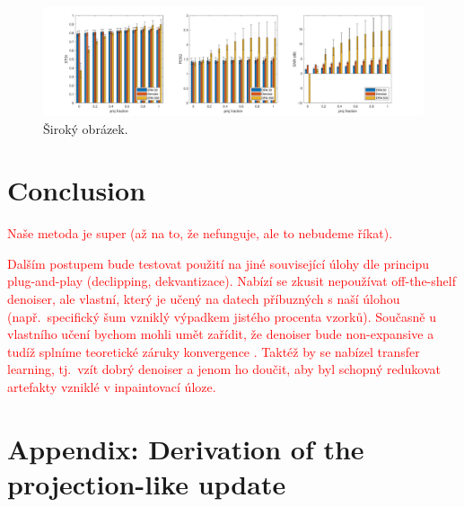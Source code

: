 \documentclass[conference]{IEEEtran}
\newcommand{\todo}[1]{\textcolor{red}{#1}}
\begin{document}
\begin{figure}
	\includegraphics[width=\linewidth]{figures/final2_with_errors}
	\caption{Široký obrázek.}
	\label{fig:final2witherrors}
\end{figure}

\section{Conclusion}
\label{sec:conclusion}

\todo{Naše metoda je super (až na to, že nefunguje, ale to nebudeme říkat).}

\todo{Dalším postupem bude testovat použití na jiné související úlohy dle principu plug-and-play (declipping, dekvantizace). Nabízí se zkusit nepoužívat off-the-shelf denoiser, ale vlastní, který je učený na datech příbuzných s naší úlohou (např.\ specifický šum vzniklý výpadkem jistého procenta vzorků). Současně u vlastního učení bychom mohli umět zařídit, že denoiser bude non-expansive a tudíž splníme teoretické záruky konvergence \cite{Venkatakrishnan2013,Chan2016}. Taktéž by se nabízel transfer learning, tj.\ vzít dobrý denoiser a jenom ho doučit, aby byl schopný redukovat artefakty vzniklé v inpaintovací úloze.}

\section*{Appendix: Derivation of the projection-like update}
\end{document}
